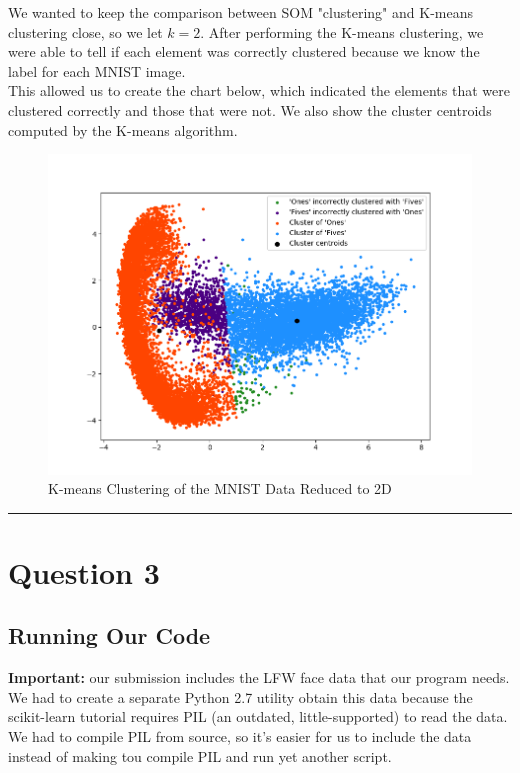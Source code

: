 \documentclass[11pt]{article}
\begin{document}
We wanted to keep the comparison between SOM "clustering" and K-means
clustering close, so we let \(k = 2\). After performing the K-means
clustering, we were able to tell if each element was correctly clustered
because we know the label for each MNIST image.
\\

This allowed us to
create the chart below, which indicated the elements that were clustered
correctly and those that were not. We also show the cluster centroids
computed by the K-means algorithm.

\begin{figure}[h!]
	\centering
	\includegraphics[scale=0.9]{../figures/q2/kmeans-clustering-small-dots.png}
	\caption{K-means Clustering of the MNIST Data Reduced to 2D}
\end{figure}

\begin{center}\rule{0.5\linewidth}{\linethickness}\end{center}

\pagebreak


\section{Question 3}\label{question-3}

\subsection{Running Our Code}\label{running-our-code}

\textbf{Important:} our submission includes the LFW face data that our
program needs. We had to create a separate Python 2.7 utility obtain
this data because the scikit-learn tutorial requires PIL (an outdated,
little-supported) to read the data. We had to compile PIL from source,
so it's easier for us to include the data instead of making tou compile
PIL and run yet another script.
\\
\end{document}

